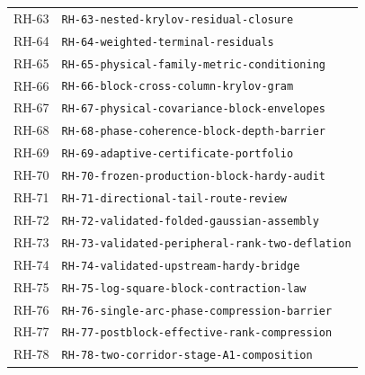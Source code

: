 \begin{longtable}{r >{\raggedright\arraybackslash}p{}}
RH-63 & \texttt{RH-\allowbreak{}63-\allowbreak{}nested-\allowbreak{}krylov-\allowbreak{}residual-\allowbreak{}closure}\\
RH-64 & \texttt{RH-\allowbreak{}64-\allowbreak{}weighted-\allowbreak{}terminal-\allowbreak{}residuals}\\
RH-65 & \texttt{RH-\allowbreak{}65-\allowbreak{}physical-\allowbreak{}family-\allowbreak{}metric-\allowbreak{}conditioning}\\
RH-66 & \texttt{RH-\allowbreak{}66-\allowbreak{}block-\allowbreak{}cross-\allowbreak{}column-\allowbreak{}krylov-\allowbreak{}gram}\\
RH-67 & \texttt{RH-\allowbreak{}67-\allowbreak{}physical-\allowbreak{}covariance-\allowbreak{}block-\allowbreak{}envelopes}\\
RH-68 & \texttt{RH-\allowbreak{}68-\allowbreak{}phase-\allowbreak{}coherence-\allowbreak{}block-\allowbreak{}depth-\allowbreak{}barrier}\\
RH-69 & \texttt{RH-\allowbreak{}69-\allowbreak{}adaptive-\allowbreak{}certificate-\allowbreak{}portfolio}\\
RH-70 & \texttt{RH-\allowbreak{}70-\allowbreak{}frozen-\allowbreak{}production-\allowbreak{}block-\allowbreak{}hardy-\allowbreak{}audit}\\
RH-71 & \texttt{RH-\allowbreak{}71-\allowbreak{}directional-\allowbreak{}tail-\allowbreak{}route-\allowbreak{}review}\\
RH-72 & \texttt{RH-\allowbreak{}72-\allowbreak{}validated-\allowbreak{}folded-\allowbreak{}gaussian-\allowbreak{}assembly}\\
RH-73 & \texttt{RH-\allowbreak{}73-\allowbreak{}validated-\allowbreak{}peripheral-\allowbreak{}rank-\allowbreak{}two-\allowbreak{}deflation}\\
RH-74 & \texttt{RH-\allowbreak{}74-\allowbreak{}validated-\allowbreak{}upstream-\allowbreak{}hardy-\allowbreak{}bridge}\\
RH-75 & \texttt{RH-\allowbreak{}75-\allowbreak{}log-\allowbreak{}square-\allowbreak{}block-\allowbreak{}contraction-\allowbreak{}law}\\
RH-76 & \texttt{RH-\allowbreak{}76-\allowbreak{}single-\allowbreak{}arc-\allowbreak{}phase-\allowbreak{}compression-\allowbreak{}barrier}\\
RH-77 & \texttt{RH-\allowbreak{}77-\allowbreak{}postblock-\allowbreak{}effective-\allowbreak{}rank-\allowbreak{}compression}\\
RH-78 & \texttt{RH-\allowbreak{}78-\allowbreak{}two-\allowbreak{}corridor-\allowbreak{}stage-\allowbreak{}A1-\allowbreak{}composition}\\

\end{longtable}
